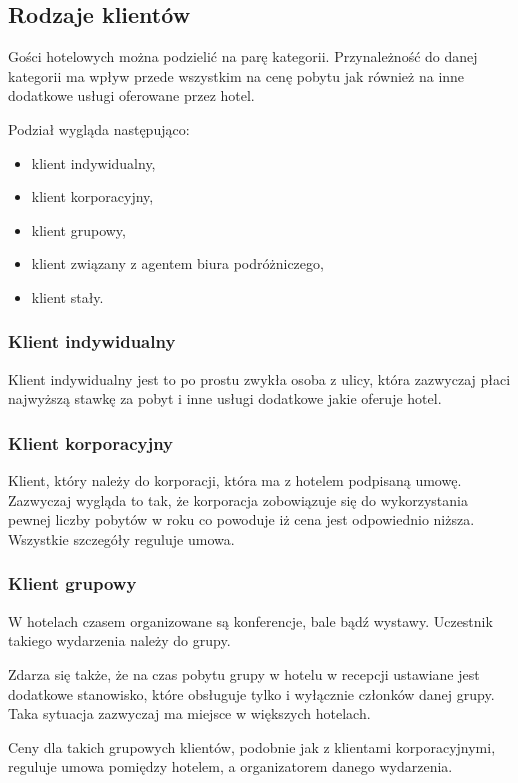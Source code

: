 \documentclass[a4paper,onecolumn,oneside,11pt,wide,floatssmall]{mwrep}
\theoremstyle{definition}
\theoremstyle{plain}%
\theoremstyle{remark}
\begin{document}
\subsection{Rodzaje klientów}
\label{rodzaje_klientow}
Gości hotelowych można podzielić na parę kategorii. Przynależność do danej
kategorii ma wpływ przede wszystkim na cenę pobytu jak również na inne 
dodatkowe usługi oferowane przez hotel. 

Podział wygląda następująco:
\begin{itemize}
  \item klient indywidualny,
  \item klient korporacyjny,
  \item klient grupowy,
  \item klient związany z agentem biura podróżniczego,
  \item klient stały.
\end{itemize}

\subsubsection{Klient indywidualny}
Klient indywidualny jest to po prostu zwykła osoba z ulicy, która zazwyczaj
płaci najwyższą stawkę za pobyt i inne usługi dodatkowe jakie oferuje hotel.

\subsubsection{Klient korporacyjny}
Klient, który należy do korporacji, która ma z hotelem podpisaną umowę.
Zazwyczaj wygląda to tak, że korporacja zobowiązuje się do wykorzystania 
pewnej liczby pobytów w roku co powoduje iż cena jest odpowiednio niższa.
Wszystkie szczegóły reguluje umowa.

\subsubsection{Klient grupowy}
W hotelach czasem organizowane są konferencje, bale bądź wystawy. Uczestnik
takiego wydarzenia należy do grupy.

Zdarza się także, że na czas pobytu grupy w hotelu w recepcji ustawiane 
jest dodatkowe stanowisko, które obsługuje tylko i wyłącznie członków danej 
grupy. Taka sytuacja zazwyczaj ma miejsce w większych hotelach.

Ceny dla takich grupowych klientów, podobnie jak z klientami korporacyjnymi,
reguluje umowa pomiędzy hotelem, a organizatorem danego wydarzenia.
\end{document}
